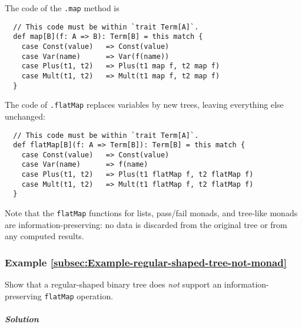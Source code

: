 The code of the \lstinline!.map! method is
\begin{lstlisting}
  // This code must be within `trait Term[A]`.
  def map[B](f: A => B): Term[B] = this match {
    case Const(value)   => Const(value)
    case Var(name)      => Var(f(name))
    case Plus(t1, t2)   => Plus(t1 map f, t2 map f)
    case Mult(t1, t2)   => Mult(t1 map f, t2 map f)
  }
\end{lstlisting}
The code of \lstinline!.flatMap! replaces variables by new trees,
leaving everything else unchanged:
\begin{lstlisting}
  // This code must be within `trait Term[A]`.
  def flatMap[B](f: A => Term[B]): Term[B] = this match {
    case Const(value)   => Const(value)
    case Var(name)      => f(name)
    case Plus(t1, t2)   => Plus(t1 flatMap f, t2 flatMap f)
    case Mult(t1, t2)   => Mult(t1 flatMap f, t2 flatMap f)
  }
\end{lstlisting}

Note that the \lstinline!flatMap! functions for lists, pass/fail
monads, and tree-like monads are information-preserving: no data is
discarded from the original tree or from any computed results.

\subsubsection{Example \label{subsec:Example-regular-shaped-tree-not-monad}\ref{subsec:Example-regular-shaped-tree-not-monad}}

Show that a regular-shaped binary tree does \emph{not} support an
information-preserving \lstinline!flatMap! operation.

\subparagraph{Solution}

